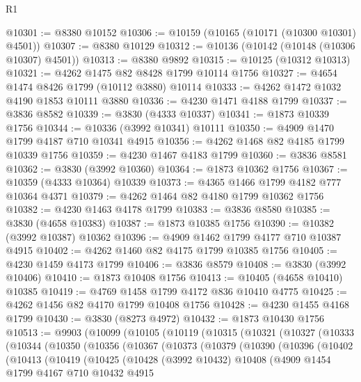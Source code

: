 \begin{lexlean}{R1}
\begin{coremodule}
@10301 := @8380 @10152
@10306 := @10159 (@10165 (@10171 (@10300 @10301) @4501))
@10307 := @8380 @10129
@10312 := @10136 (@10142 (@10148 (@10306 @10307) @4501))
@10313 := @8380 @9892
@10315 := @10125 (@10312 @10313)
@10321 := @4262 @1475 @82 @8428 @1799 @10114 @1756
@10327 := @4654 @1474 @8426 @1799 (@10112 @3880) @10114
@10333 := @4262 @1472 @1032 @4190 @1853 @10111 @3880
@10336 := @4230 @1471 @4188 @1799
@10337 := @3836 @8582
@10339 := @3830 (@4333 @10337)
@10341 := @1873 @10339 @1756
@10344 := @10336 (@3992 @10341) @10111
@10350 := @4909 @1470 @1799 @4187 @710 @10341 @4915
@10356 := @4262 @1468 @82 @4185 @1799 @10339 @1756
@10359 := @4230 @1467 @4183 @1799
@10360 := @3836 @8581
@10362 := @3830 (@3992 @10360)
@10364 := @1873 @10362 @1756
@10367 := @10359 (@4333 @10364) @10339
@10373 := @4365 @1466 @1799 @4182 @777 @10364 @4371
@10379 := @4262 @1464 @82 @4180 @1799 @10362 @1756
@10382 := @4230 @1463 @4178 @1799
@10383 := @3836 @8580
@10385 := @3830 (@4658 @10383)
@10387 := @1873 @10385 @1756
@10390 := @10382 (@3992 @10387) @10362
@10396 := @4909 @1462 @1799 @4177 @710 @10387 @4915
@10402 := @4262 @1460 @82 @4175 @1799 @10385 @1756
@10405 := @4230 @1459 @4173 @1799
@10406 := @3836 @8579
@10408 := @3830 (@3992 @10406)
@10410 := @1873 @10408 @1756
@10413 := @10405 (@4658 @10410) @10385
@10419 := @4769 @1458 @1799 @4172 @836 @10410 @4775
@10425 := @4262 @1456 @82 @4170 @1799 @10408 @1756
@10428 := @4230 @1455 @4168 @1799
@10430 := @3830 (@8273 @4972)
@10432 := @1873 @10430 @1756
@10513 := @9903
    (@10099
      (@10105
        (@10119
          (@10315
            (@10321
              (@10327
                (@10333
                  (@10344
                    (@10350
                      (@10356
                        (@10367
                          (@10373
                            (@10379
                              (@10390
                                (@10396
                                  (@10402
                                    (@10413
                                      (@10419
                                        (@10425
                                          (@10428
                                            (@3992 @10432)
                                            @10408
                                            (@4909
                                              @1454
                                              @1799
                                              @4167
                                              @710
                                              @10432
                                              @4915

\end{coremodule}
\end{lexlean}
